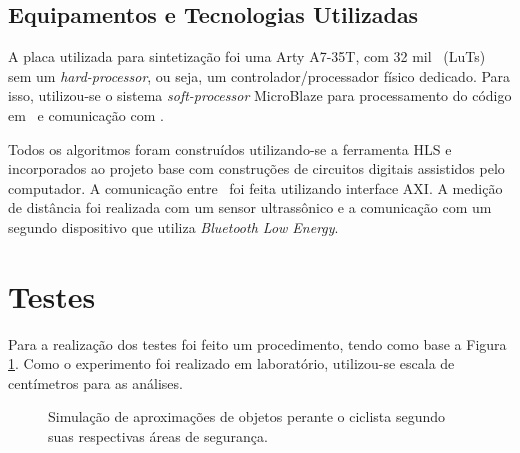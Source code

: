     
    \subsection{Equipamentos e Tecnologias Utilizadas}
        A placa utilizada para sintetização foi uma Arty A7-35T, com 32 mil \luts\ (LuTs) sem um \textit{hard-processor}, ou seja, um controlador/processador físico dedicado.
        Para isso, utilizou-se o sistema \textit{soft-processor} MicroBlaze para processamento do código em \software\ e comunicação com \hardware.
        
        
        Todos os algoritmos foram construídos utilizando-se a ferramenta HLS e incorporados ao projeto base com construções de circuitos digitais assistidos pelo computador.
        A comunicação entre \hs\ foi feita utilizando interface AXI.
        A medição de distância foi realizada com um sensor ultrassônico e a comunicação com um segundo dispositivo que utiliza \textit{Bluetooth Low Energy}.
        
        
    \section{Testes}
        Para a realização dos testes foi feito um procedimento, tendo como base a Figura \ref{fig:distance}. 
        Como o experimento foi realizado em laboratório, utilizou-se escala de centímetros para as análises.
        
        \begin{figure}[h] \centering
            \caption{Simulação de aproximações de objetos perante o ciclista segundo suas respectivas áreas de segurança.}
            \label{fig:distance}
        \end{figure}
    
